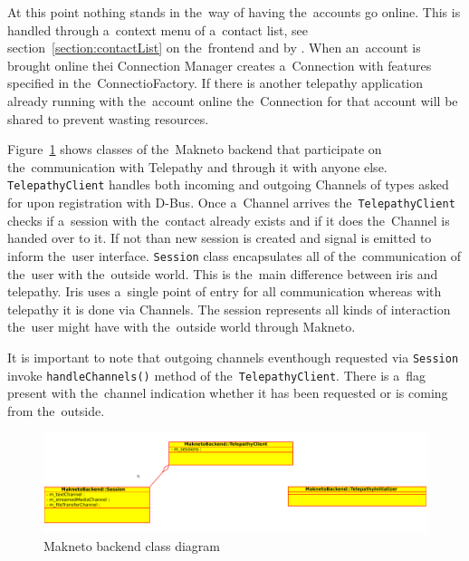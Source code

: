 At this point nothing stands in the~way of having the~accounts go online. This is handled through a~context menu of a~contact list, see section~\ref{section:contactList} on the~frontend and by . When an~account is brought online thei Connection Manager creates a~Connection with features specified in the~ConnectioFactory. If there is another telepathy application already running with the~account online the~Connection for that account will be shared to prevent wasting resources. 

Figure~\ref{fig:MaknetoBackendClassDiag} shows classes of the~Makneto backend that participate on the~communication with Telepathy and through it with anyone else. \verb|TelepathyClient| handles both incoming and outgoing  Channels of types asked for upon registration with D-Bus. Once a~Channel arrives the~\verb|TelepathyClient| checks if a~session with the~contact already exists and if it does the~Channel is handed over to it. If not than new session is created and signal is emitted to inform the~user interface. \verb|Session| class encapsulates all of the~communication of the~user with the~outside world. This is the~main difference between iris and telepathy. Iris uses a~single point of entry for all communication whereas with telepathy it is done via Channels. The session represents all kinds of interaction the~user might have with the~outside world through Makneto. 

It is important to note that outgoing channels eventhough requested via \verb|Session| invoke \verb|handleChannels()| method of the~\verb|TelepathyClient|. There is a~flag present with the~channel indication whether it has been requested or is coming from the~outside. 

\begin{figure}[ht]
	\begin{center}
	\includegraphics[width=15cm]{fig/makneto-backend-class-diag.pdf}
	\caption{Makneto backend class diagram}
	\label{fig:MaknetoBackendClassDiag}
\end{center}
\end{figure}

